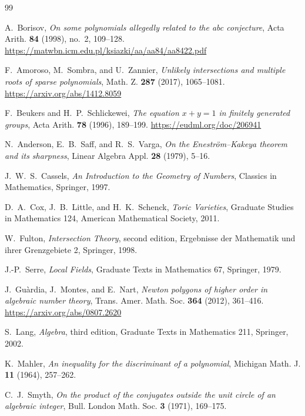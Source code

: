 \documentclass[11pt]{article}
\theoremstyle{definition}
\begin{document}
\begin{thebibliography}{99}

A.~Borisov,
\emph{On some polynomials allegedly related to the abc conjecture},
Acta Arith. \textbf{84} (1998), no.~2, 109--128.
\url{https://matwbn.icm.edu.pl/ksiazki/aa/aa84/aa8422.pdf}


F.~Amoroso, M.~Sombra, and U.~Zannier,
\emph{Unlikely intersections and multiple roots of sparse polynomials},
Math. Z. \textbf{287} (2017), 1065--1081.
\url{https://arxiv.org/abs/1412.8059}

F.~Beukers and H.~P.~Schlickewei,
\emph{The equation \(x+y=1\) in finitely generated groups},
Acta Arith. \textbf{78} (1996), 189--199.
\url{https://eudml.org/doc/206941}

N.~Anderson, E.~B.~Saff, and R.~S.~Varga,
\emph{On the Enestr\"om--Kakeya theorem and its sharpness},
Linear Algebra Appl. \textbf{28} (1979), 5--16.

J.~W.~S.~Cassels,
\emph{An Introduction to the Geometry of Numbers},
Classics in Mathematics, Springer, 1997.

D.~A.~Cox, J.~B.~Little, and H.~K.~Schenck,
\emph{Toric Varieties},
Graduate Studies in Mathematics 124, American Mathematical Society, 2011.

W.~Fulton,
\emph{Intersection Theory}, second edition,
Ergebnisse der Mathematik und ihrer Grenzgebiete 2,
Springer, 1998.

J.-P.~Serre,
\emph{Local Fields},
Graduate Texts in Mathematics 67, Springer, 1979.

J.~Gu\`ardia, J.~Montes, and E.~Nart,
\emph{Newton polygons of higher order in algebraic number theory},
Trans. Amer. Math. Soc. \textbf{364} (2012), 361--416.
\url{https://arxiv.org/abs/0807.2620}

S.~Lang,
\emph{Algebra}, third edition,
Graduate Texts in Mathematics 211, Springer, 2002.

K.~Mahler,
\emph{An inequality for the discriminant of a polynomial},
Michigan Math. J. \textbf{11} (1964), 257--262.

C.~J.~Smyth,
\emph{On the product of the conjugates outside the unit circle of an
algebraic integer},
Bull. London Math. Soc. \textbf{3} (1971), 169--175.

\end{thebibliography}
\end{document}
